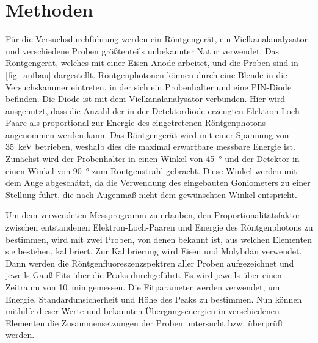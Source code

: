 \documentclass[
	a4paper,
	12pt,
	pagesize,
	ngerman
]{scrartcl}
\begin{document}
	
	
	\section{Methoden}
	Für die Versuchsdurchführung werden ein Röntgengerät, ein Vielkanalanalysator und verschiedene Proben größtenteils unbekannter Natur verwendet. %
	Das Röntgengerät, welches mit einer Eisen-Anode arbeitet, und die Proben sind in \cref{fig_aufbau} dargestellt.
	Röntgenphotonen können durch eine Blende in die Versuchskammer eintreten, in der sich ein Probenhalter und eine PIN-Diode befinden.
	Die Diode ist mit dem Vielkanalanalysator verbunden.
	Hier wird ausgenutzt, dass die Anzahl der in der Detektordiode erzeugten Elektron-Loch-Paare als proportional zur Energie des eingetretenen Röntgenphotons angenommen werden kann. %
	Das Röntgengerät wird mit einer Spannung von \SI{35}{\kilo \electronvolt} betrieben, weshalb dies die maximal erwartbare messbare Energie ist.
	Zunächst wird der Probenhalter in einen Winkel von \SI{45}{\degree} und der Detektor in einen Winkel von \SI{90}{\degree} zum Röntgenstrahl gebracht.
	Diese Winkel werden mit dem Auge abgeschätzt, da die Verwendung des eingebauten Goniometers zu einer Stellung führt, die nach Augenmaß nicht dem gewünschten Winkel entspricht.
	
	Um dem verwendeten Messprogramm zu erlauben, den Proportionalitätsfaktor zwischen entstandenen Elektron-Loch-Paaren und Energie des Röntgenphotons zu bestimmen, wird mit zwei Proben, von denen bekannt ist, aus welchen Elementen sie bestehen, kalibriert.
	Zur Kalibrierung wird Eisen und Molybdän verwendet.
	Dann werden die Röntgenfluoreszenzspektren aller Proben aufgezeichnet und jeweils Gauß-Fits über die Peaks durchgeführt.
	Es wird jeweils über einen Zeitraum von \SI{10}{\minute} gemessen.
	Die Fitparameter werden verwendet, um Energie, Standardunsicherheit und Höhe des Peaks zu bestimmen.
	Nun können mithilfe dieser Werte und bekannten Übergangsenergien in verschiedenen Elementen die Zusammensetzungen der Proben untersucht bzw. überprüft werden.
	
\end{document}
